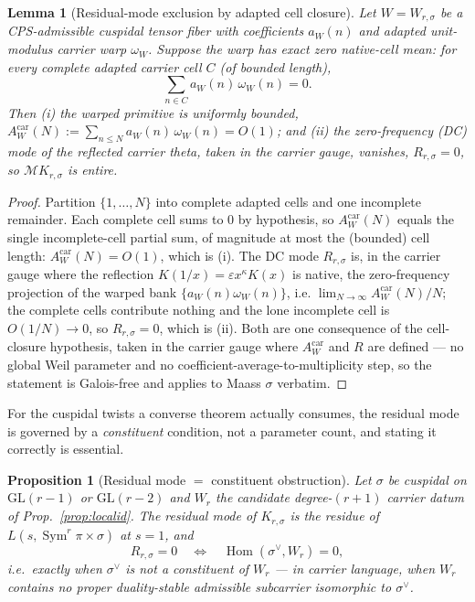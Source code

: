 \documentclass[11pt]{article}
\newtheorem{lemma}[theorem]{Lemma}
\newtheorem{proposition}[theorem]{Proposition}
\theoremstyle{definition}
\newcommand{\Sym}{\operatorname{Sym}}
\begin{document}
\begin{lemma}[Residual-mode exclusion by adapted cell closure]\label{lem:residual}
Let $W=W_{r,\sigma}$ be a CPS-admissible cuspidal tensor fiber with coefficients $a_W(n)$ and adapted
unit-modulus carrier warp $\omega_W$. Suppose the warp has \emph{exact zero native-cell mean}: for every
complete adapted carrier cell $C$ (of bounded length),
\[
  \sum_{n\in C} a_W(n)\,\omega_W(n)=0 .
\]
Then \textup{(i)} the warped primitive is uniformly bounded,
$A^{\mathrm{car}}_W(N):=\sum_{n\le N} a_W(n)\,\omega_W(n)=O(1)$; and \textup{(ii)} the zero-frequency (DC)
mode of the reflected carrier theta, taken in the carrier gauge, vanishes, $R_{r,\sigma}=0$, so
$\mathcal M K_{r,\sigma}$ is entire.
\end{lemma}

\begin{proof}
Partition $\{1,\dots,N\}$ into complete adapted cells and one incomplete remainder. Each complete cell sums
to $0$ by hypothesis, so $A^{\mathrm{car}}_W(N)$ equals the single incomplete-cell partial sum, of magnitude
at most the (bounded) cell length: $A^{\mathrm{car}}_W(N)=O(1)$, which is \textup{(i)}. The DC mode
$R_{r,\sigma}$ is, in the carrier gauge where the reflection $K(1/x)=\varepsilon x^{\kappa}K(x)$ is native,
the zero-frequency projection of the warped bank $\{a_W(n)\omega_W(n)\}$, i.e.
$\lim_{N\to\infty}A^{\mathrm{car}}_W(N)/N$; the complete cells contribute nothing and the lone incomplete
cell is $O(1/N)\to0$, so $R_{r,\sigma}=0$, which is \textup{(ii)}. Both are one consequence of the
cell-closure hypothesis, taken in the carrier gauge where $A^{\mathrm{car}}_W$ and $R$ are defined --- no
global Weil parameter and no coefficient-average-to-multiplicity step, so the statement is Galois-free and
applies to Maass $\sigma$ verbatim.
\end{proof}

For the cuspidal twists a converse theorem actually consumes, the residual mode is governed by a
\emph{constituent} condition, not a parameter count, and stating it correctly is essential.

\begin{proposition}[Residual mode $=$ constituent obstruction]\label{prop:constituent}
Let $\sigma$ be cuspidal on $\mathrm{GL}(r-1)$ or $\mathrm{GL}(r-2)$ and $W_r$ the candidate degree-$(r+1)$
carrier datum of Prop.~\ref{prop:localid}. The residual mode of $K_{r,\sigma}$ is the residue of
$L(s,\Sym^r\pi\times\sigma)$ at $s=1$, and
\[
  R_{r,\sigma}=0\quad\Longleftrightarrow\quad \operatorname{Hom}(\sigma^{\vee},W_r)=0,
\]
i.e.\ exactly when $\sigma^{\vee}$ is \emph{not a constituent} of $W_r$ --- in carrier language, when $W_r$
contains no proper duality-stable admissible subcarrier isomorphic to $\sigma^{\vee}$.
\end{proposition}
\end{document}
